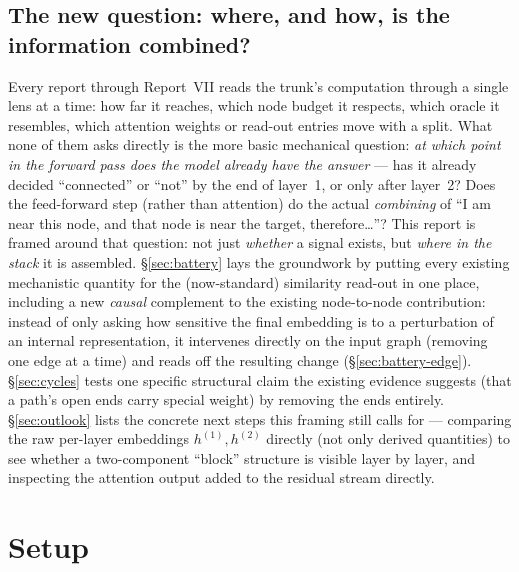 \documentclass[11pt,a4paper]{article}
\begin{document}
\subsection{The new question: where, and how, is the information combined?}
\label{sec:question}

Every report through Report~VII reads the trunk's computation through a single
lens at a time: how far it reaches, which node budget it respects, which
oracle it resembles, which attention weights or read-out entries move with a
split. What none of them asks directly is the more basic mechanical question:
\emph{at which point in the forward pass does the model already have the
answer} --- has it already decided ``connected'' or ``not'' by the end of
layer~1, or only after layer~2? Does the feed-forward step (rather than
attention) do the actual \emph{combining} of ``I am near this node, and that
node is near the target, therefore\ldots''? This report is framed around that
question: not just \emph{whether} a signal exists, but \emph{where in the
stack} it is assembled. \S\ref{sec:battery} lays the groundwork by putting
every existing mechanistic quantity for the (now-standard) similarity
read-out in one place, including a new \emph{causal} complement to the
existing node-to-node contribution: instead of only asking how sensitive the
final embedding is to a perturbation of an internal representation, it
intervenes directly on the input graph (removing one edge at a time) and
reads off the resulting change (\S\ref{sec:battery-edge}). \S\ref{sec:cycles}
tests one specific structural claim the existing evidence suggests (that a
path's open ends carry special weight) by removing the ends entirely.
\S\ref{sec:outlook} lists the concrete next steps this framing still calls
for --- comparing the raw per-layer embeddings $h^{(1)}, h^{(2)}$ directly
(not only derived quantities) to see whether a two-component ``block''
structure is visible layer by layer, and inspecting the attention output
added to the residual stream directly.

\section{Setup}
\label{sec:setup}
\end{document}
